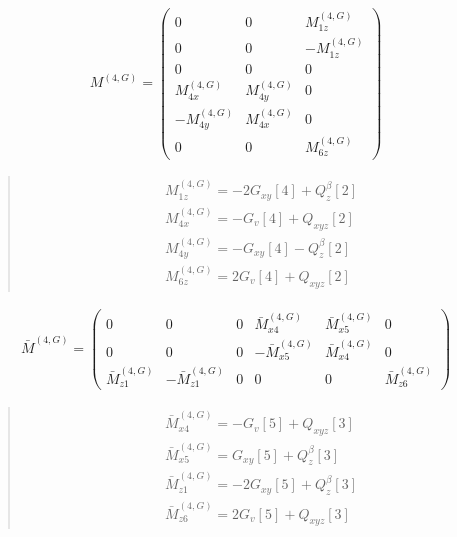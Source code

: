 \documentclass[fleqn,10pt]{jsarticle}
\begin{document}
\begin{align*}
M^{(4,G)} = \begin{pmatrix} 0 & 0 & M^{(4,G)}_{1z} \\ 0 & 0 & - M^{(4,G)}_{1z} \\ 0 & 0 & 0 \\ M^{(4,G)}_{4x} & M^{(4,G)}_{4y} & 0 \\ - M^{(4,G)}_{4y} & M^{(4,G)}_{4x} & 0 \\ 0 & 0 & M^{(4,G)}_{6z} \end{pmatrix}
\end{align*}
\begin{quote}
\begin{align*}
& M^{(4,G)}_{1z} = - 2 G_{xy}[4] + Q_{z}^{\beta}[2] \\
& M^{(4,G)}_{4x} = - G_{v}[4] + Q_{xyz}[2] \\
& M^{(4,G)}_{4y} = - G_{xy}[4] - Q_{z}^{\beta}[2] \\
& M^{(4,G)}_{6z} = 2 G_{v}[4] + Q_{xyz}[2]
\end{align*}
\end{quote}
\begin{align*}
\bar{M}^{(4,G)} = \begin{pmatrix} 0 & 0 & 0 & \bar{M}^{(4,G)}_{x4} & \bar{M}^{(4,G)}_{x5} & 0 \\ 0 & 0 & 0 & - \bar{M}^{(4,G)}_{x5} & \bar{M}^{(4,G)}_{x4} & 0 \\ \bar{M}^{(4,G)}_{z1} & - \bar{M}^{(4,G)}_{z1} & 0 & 0 & 0 & \bar{M}^{(4,G)}_{z6} \end{pmatrix}
\end{align*}
\begin{quote}
\begin{align*}
& \bar{M}^{(4,G)}_{x4} = - G_{v}[5] + Q_{xyz}[3] \\
& \bar{M}^{(4,G)}_{x5} = G_{xy}[5] + Q_{z}^{\beta}[3] \\
& \bar{M}^{(4,G)}_{z1} = - 2 G_{xy}[5] + Q_{z}^{\beta}[3] \\
& \bar{M}^{(4,G)}_{z6} = 2 G_{v}[5] + Q_{xyz}[3]
\end{align*}
\end{quote}
\end{document}
